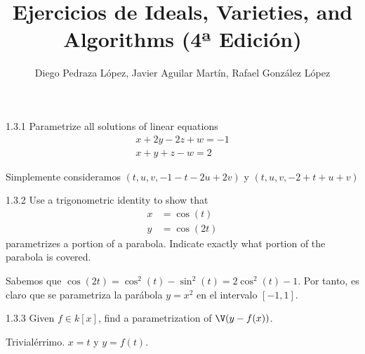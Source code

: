 \documentclass[twoside]{article}
\begin{document}
\title{Ejercicios de Ideals, Varieties, and Algorithms (4ª Edición)}
\author{Diego Pedraza López, Javier Aguilar Martín, Rafael González López}
\maketitle

\begin{ejercicio}{1.3.1}
Parametrize all solutions of linear equations
\begin{align*}
x+2y-2z+w=-1\\
x+y+z-w=2
\end{align*}
\end{ejercicio}
\begin{solucion}
Simplemente consideramos $(t,u,v,-1-t-2u+2v)$ y $(t,u,v,-2+t+u+v)$
\end{solucion}

\newpage

\begin{ejercicio}{1.3.2}
Use a trigonometric identity to show that
\begin{align*}
x&=\cos(t)\\
y&=\cos(2t)
\end{align*}
parametrizes a portion of a parabola. Indicate exactly what portion of the parabola is covered.
\end{ejercicio}
\begin{solucion}
Sabemos que $\cos(2t)=\cos^2(t)-\sin^2(t) = 2\cos^2(t)-1$. Por tanto, es claro que se parametriza la parábola $y=x^2$ en el intervalo $[-1,1]$.
\end{solucion}

\newpage

\begin{ejercicio}{1.3.3}
Given $f\in k[x]$, find a parametrization of $\V(y-f(x))$.
\end{ejercicio}
\begin{solucion}
Trivialérrimo. $x=t$ y $y=f(t)$.
\end{solucion}

\newpage
\end{document}
